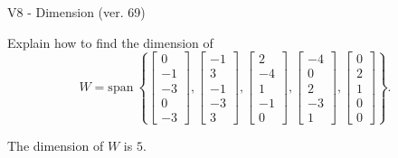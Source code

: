 \begin{exercise}
  \begin{exerciseTitle}V8 - Dimension (ver. 69)\end{exerciseTitle}
  \begin{exerciseStatement}
    Explain how to find the dimension of 
\[W=\mathrm{span}\ \left\{\left[\begin{array}{r}
0 \\
-1 \\
-3 \\
0 \\
-3
\end{array}\right] , \left[\begin{array}{r}
-1 \\
3 \\
-1 \\
-3 \\
3
\end{array}\right] , \left[\begin{array}{r}
2 \\
-4 \\
1 \\
-1 \\
0
\end{array}\right] , \left[\begin{array}{r}
-4 \\
0 \\
2 \\
-3 \\
1
\end{array}\right] , \left[\begin{array}{r}
0 \\
2 \\
1 \\
0 \\
0
\end{array}\right]\right\}.\]



  \end{exerciseStatement}
  \begin{exerciseAnswer}
   The dimension of \(W\) is  \(5\).
  


  \end{exerciseAnswer}
\end{exercise}
